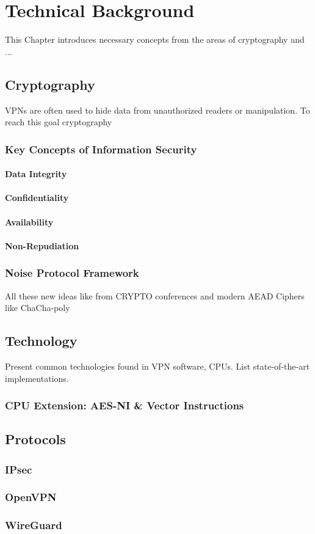 \chapter{Technical Background}
\label{chap:background}

This Chapter introduces necessary concepts from the areas of cryptography and ...

\section{Cryptography}

VPNs are often used to hide data from unauthorized readers or manipulation. To reach this goal cryptography 

\subsection{Key Concepts of Information Security}

\subsubsection{Data Integrity}

\subsubsection{Confidentiality}

\subsubsection{Availability}

\subsubsection{Non-Repudiation}

\subsection{Noise Protocol Framework}
All these new ideas like from CRYPTO conferences and modern AEAD Ciphers like ChaCha-poly

\section{Technology}
Present common technologies found in VPN software, CPUs. List state-of-the-art implementations.
\subsection{CPU Extension: AES-NI \& Vector Instructions}

\section{Protocols}
\subsection{IPsec}
\cite{ferguson1999cryptographic}
\subsection{OpenVPN}

\subsection{WireGuard}
\cite{donenfeld2017wireguard}
\cite{dowling2018cryptographic}